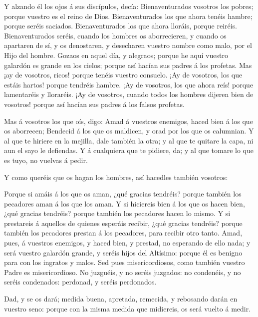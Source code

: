  Y alzando él los ojos á sus discípulos, decía:
Bienaventurados vosotros los pobres; porque vuestro es el reino de Dios.
 Bienaventurados los que ahora tenéis hambre; porque seréis
saciados. Bienaventurados los que ahora lloráis, porque reiréis.
 Bienaventurados seréis, cuando los hombres os
aborrecieren, y cuando os apartaren de sí, y os denostaren, y desecharen
vuestro nombre como malo, por el Hijo del hombre.  Gozaos
en aquel día, y alegraos; porque he aquí vuestro galardón es grande en
los cielos; porque así hacían sus padres á los profetas. 
Mas ¡ay de vosotros, ricos! porque tenéis vuestro consuelo.
 ¡Ay de vosotros, los que estáis hartos! porque tendréis
hambre. ¡Ay de vosotros, los que ahora reís! porque lamentaréis y
lloraréis.  ¡Ay de vosotros, cuando todos los hombres
dijeren bien de vosotros! porque así hacían sus padres á los falsos
profetas.

 Mas á vosotros los que oís, digo: Amad á vuestros
enemigos, haced bien á los que os aborrecen;  Bendecid á
los que os maldicen, y orad por los que os calumnian.  Y al
que te hiriere en la mejilla, dale también la otra; y al que te quitare
la capa, ni aun el sayo le defiendas.  Y á cualquiera que
te pidiere, da; y al que tomare lo que es tuyo, no vuelvas á pedir.

 Y como queréis que os hagan los hombres, así hacedles
también vosotros:

 Porque si amáis á los que os aman, ¿qué gracias tendréis?
porque también los pecadores aman á los que los aman.  Y si
hiciereis bien á los que os hacen bien, ¿qué gracias tendréis? porque
también los pecadores hacen lo mismo.  Y si prestareis á
aquellos de quienes esperáis recibir, ¿qué gracias tendréis? porque
también los pecadores prestan á los pecadores, para recibir otro tanto.
 Amad, pues, á vuestros enemigos, y haced bien, y prestad,
no esperando de ello nada; y será vuestro galardón grande, y seréis
hijos del Altísimo: porque él es benigno para con los ingratos y malos.
 Sed pues misericordiosos, como también vuestro Padre es
misericordioso.  No juzguéis, y no seréis juzgados: no
condenéis, y no seréis condenados: perdonad, y seréis perdonados.

 Dad, y se os dará; medida buena, apretada, remecida, y
rebosando darán en vuestro seno: porque con la misma medida que
midiereis, os será vuelto á medir.

